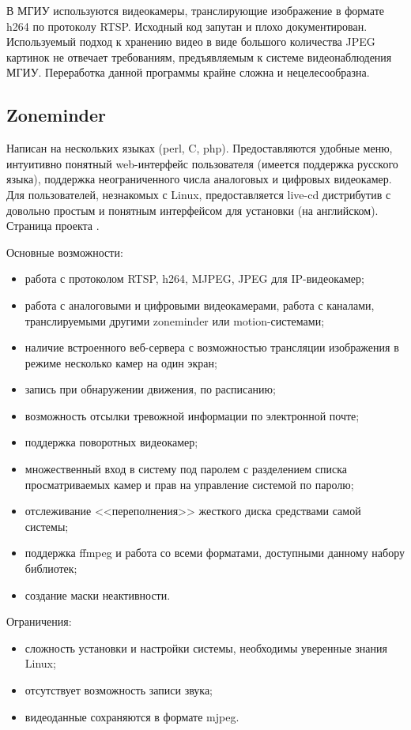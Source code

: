 В МГИУ используются видеокамеры, транслирующие изображение в формате h264 по протоколу RTSP.
Исходный код запутан и плохо документирован.
Используемый подход к хранению видео в виде большого количества JPEG картинок не
отвечает требованиям, предъявляемым к системе видеонаблюдения МГИУ.
Переработка данной программы крайне сложна и нецелесообразна.

\subsection{Zoneminder}

Написан на нескольких языках (perl, C, php).
Предоставляются удобные меню, интуитивно понятный web-интерфейс пользователя
(имеется поддержка русского языка), поддержка неограниченного числа аналоговых
и цифровых видеокамер. Для пользователей, незнакомых с Linux, предоставляется live-cd
дистрибутив с довольно простым и понятным интерфейсом для установки (на английском).
Страница проекта \cite{zoneminder_about}.

\medskip

Основные возможности:
\smallskip
\begin{itemize}
	\item
	работа с протоколом RTSP, h264, MJPEG, JPEG для IP-видеокамер;
	\item
	работа с аналоговыми и цифровыми видеокамерами, работа с каналами,
	транслируемыми другими zoneminder или motion-системами;
	\item
	наличие встроенного веб-сервера с возможностью трансляции изображения
	в режиме несколько камер на один экран;
	\item
	запись при обнаружении движения, по расписанию;
	\item
	возможность отсылки тревожной информации по электронной почте;
	\item
	поддержка поворотных видеокамер;
	\item
	множественный вход в систему под паролем с разделением списка просматриваемых камер
	и прав на управление системой по паролю;
	\item
	отслеживание <<переполнения>> жесткого диска средствами самой системы;
	\item
	поддержка ffmpeg и работа со всеми форматами, доступными данному набору библиотек;
	\item
	создание маски неактивности.
\end{itemize}

\medskip

Ограничения:
\smallskip
\begin{itemize}
	\item сложность установки и настройки системы, необходимы уверенные знания Linux;
	\item отсутствует возможность записи звука;
	\item видеоданные сохраняются в формате mjpeg.
\end{itemize}

